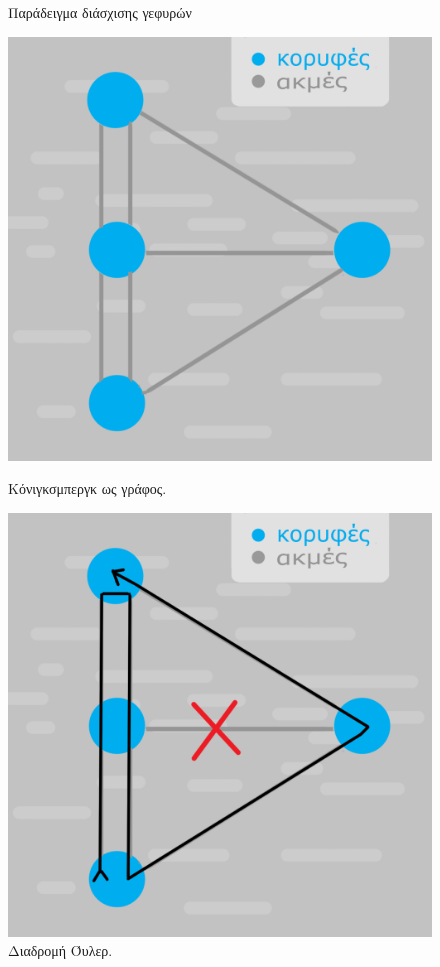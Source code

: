 \begin{figure}[ht]
\begin{minipage}[c]{.46\linewidth}
        \caption{Παράδειγμα διάσχισης γεφυρών}
    \end{minipage}
\end{figure}
\begin{figure}[ht]
    \begin{minipage}[c]{.46\linewidth}
        \centering
        \includegraphics[scale=0.15]{2947_thesis/pictures/konigsberGraph.png}
        \caption{Κόνιγκσμπεργκ ως γράφος.}
    \end{minipage}
    \hfill%
    \begin{minipage}[c]{.46\linewidth}
        \centering
        \includegraphics[scale=0.15]{2947_thesis/pictures/konigsbergEuler.png}
        \caption{Διαδρομή Όυλερ.}
    \end{minipage}
\end{figure}
